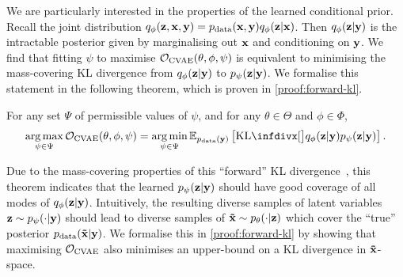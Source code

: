 We are particularly interested in the properties of the learned conditional prior.
Recall the joint distribution $q_\phi({\mathbf{z}}, {\mathbf{x}}, {\mathbf{y}}) = p_{\rm{data}}({\mathbf{x}},
{\mathbf{y}})q_\phi({\mathbf{z}}|{\mathbf{x}})$. Then $q_\phi({\mathbf{z}}|{\mathbf{y}})$ is the intractable
posterior given by marginalising out ${\mathbf{x}}$ and conditioning on ${\mathbf{y}}$. We
find that fitting $\psi$ to maximise ${\mathcal{O}}_\text{CVAE}(\theta,
\phi, \psi)$ is equivalent to minimising the mass-covering KL divergence
from $q_\phi({\mathbf{z}}|{\mathbf{y}})$ to $p_\psi({\mathbf{z}}|{\mathbf{y}})$. We formalise
this statement in the following theorem, which is proven in
\cref{proof:forward-kl}.
\begin{theorem} \label{theorem:forward-kl} For any set $\Psi$ of
  permissible values of $\psi$, and for any $\theta\in\Theta$ and
  $\phi\in\Phi$,
  \begin{equation} \label{eq:forward-theorem}
    \argmax_{\psi \in \Psi} \gO_\text{CVAE}(\theta, \phi, \psi) = \argmin_{\psi \in \Psi} \EX_{\pdata(\rvy)} \left[ \kl[\big]{ q_\phi(\rvz|\rvy) }{ p_\psi(\rvz|\rvy) } \right].
  \end{equation}
\end{theorem}
Due to the mass-covering properties of this ``forward'' KL
divergence~\citep{bishop2006pattern}, this theorem indicates that 
the learned $p_\psi({\mathbf{z}}|{\mathbf{y}})$ should have good coverage of all
modes of $q_\phi({\mathbf{z}}|{\mathbf{y}})$. Intuitively, the resulting diverse samples of
latent variables ${\mathbf{z}}\sim p_\psi(\cdot|{\mathbf{y}})$ should lead to
diverse samples of $\mathbf{\tilde{x}}{} \sim p_\theta(\cdot|{\mathbf{z}})$ which cover the
``true'' posterior $p_{\rm{data}}(\mathbf{\tilde{x}}{}|{\mathbf{y}})$. We formalise this in
\cref{proof:forward-kl} by showing that maximising ${\mathcal{O}}_\text{CVAE}$
also minimises an upper-bound on a KL divergence in $\mathbf{\tilde{x}}{}$-space.

